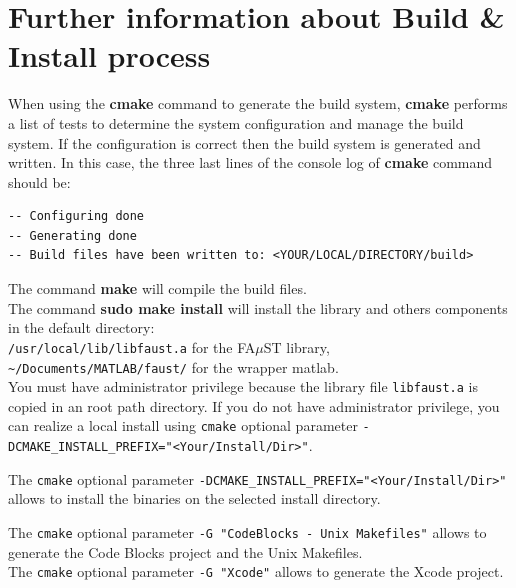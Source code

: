 \section{Further information about Build \& Install process}\label{sec:ANNEXEInfoBuildInstall}
When using the \textbf{cmake} command to generate the build system, \textbf{cmake} performs a list of tests to determine the system configuration and manage the build system. If the configuration is correct then the build system is generated and written. In this case, the three last lines of the console log of \textbf{cmake} command should be:
\lstset{style=customBash}
\begin{lstlisting}
-- Configuring done 
-- Generating done 
-- Build files have been written to: <YOUR/LOCAL/DIRECTORY/build>
\end{lstlisting}

The command \textbf{make} will compile the build files.\\

The command \textbf{sudo make install} will install the library and others components in the default directory: \\
\texttt{/usr/local/lib/libfaust.a} for the FA$\mu$ST library, \\
\texttt{\textasciitilde /Documents/MATLAB/faust/} for the wrapper matlab.\\
You must have administrator privilege because the library file \texttt{libfaust.a} is copied in an root path directory. If you do not have administrator privilege, you can realize a local install using \texttt{cmake} optional parameter \texttt{-DCMAKE\_INSTALL\_PREFIX="<Your/Install/Dir>"}. 

The \texttt{cmake} optional parameter \texttt{-DCMAKE\_INSTALL\_PREFIX="<Your/Install/Dir>"} allows to install the binaries on the selected install directory. 

The \texttt{cmake} optional parameter \texttt{-G "CodeBlocks - Unix Makefiles"} allows to generate the Code Blocks project and the Unix Makefiles.\\ 
The \texttt{cmake} optional parameter \texttt{-G "Xcode"} allows to generate the Xcode project. 




